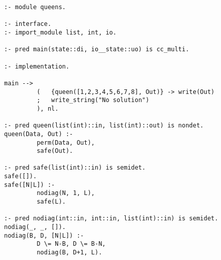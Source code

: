 \begin{verbatim}
:- module queens.

:- interface.
:- import_module list, int, io.

:- pred main(state::di, io__state::uo) is cc_multi.

:- implementation.

main -->
         (   {queen([1,2,3,4,5,6,7,8], Out)} -> write(Out)
         ;   write_string("No solution")
         ), nl.

:- pred queen(list(int)::in, list(int)::out) is nondet.
queen(Data, Out) :-
         perm(Data, Out),
         safe(Out).

:- pred safe(list(int)::in) is semidet.
safe([]).
safe([N|L]) :-
         nodiag(N, 1, L),
         safe(L).

:- pred nodiag(int::in, int::in, list(int)::in) is semidet.
nodiag(_, _, []).
nodiag(B, D, [N|L]) :-
         D \= N-B, D \= B-N,
         nodiag(B, D+1, L).
\end{verbatim}
